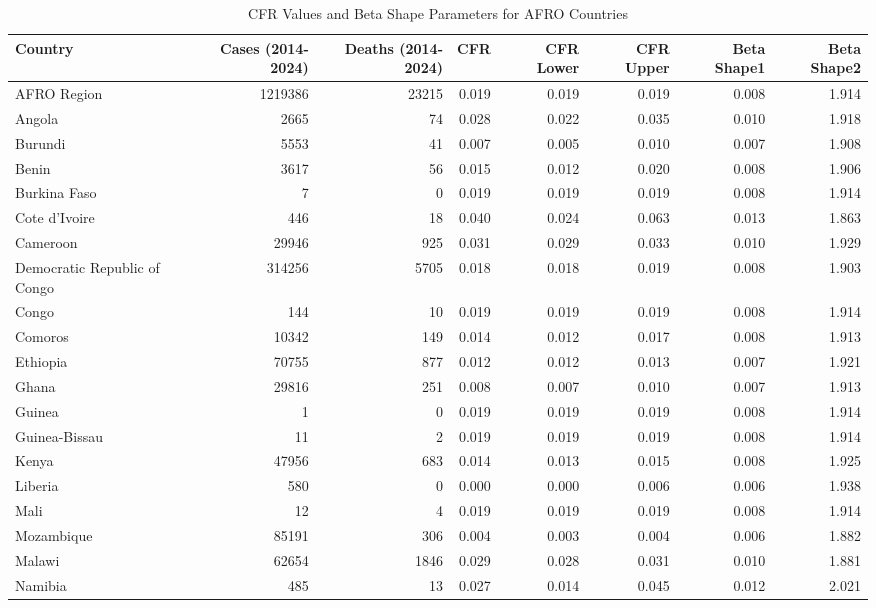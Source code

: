 \documentclass[
]{book}
\begin{document}
\begin{table}
\centering
\caption{\label{tab:cfr}CFR Values and Beta Shape Parameters for AFRO Countries}
\centering
\begin{tabular}[t]{l|r|r|r|r|r|r|r}
\hline
Country & Cases (2014-2024) & Deaths (2014-2024) & CFR & CFR Lower & CFR Upper & Beta Shape1 & Beta Shape2\\
\hline
AFRO Region & 1219386 & 23215 & 0.019 & 0.019 & 0.019 & 0.008 & 1.914\\
\hline
Angola & 2665 & 74 & 0.028 & 0.022 & 0.035 & 0.010 & 1.918\\
\hline
Burundi & 5553 & 41 & 0.007 & 0.005 & 0.010 & 0.007 & 1.908\\
\hline
Benin & 3617 & 56 & 0.015 & 0.012 & 0.020 & 0.008 & 1.906\\
\hline
Burkina Faso & 7 & 0 & 0.019 & 0.019 & 0.019 & 0.008 & 1.914\\
\hline
Cote d'Ivoire & 446 & 18 & 0.040 & 0.024 & 0.063 & 0.013 & 1.863\\
\hline
Cameroon & 29946 & 925 & 0.031 & 0.029 & 0.033 & 0.010 & 1.929\\
\hline
Democratic Republic of Congo & 314256 & 5705 & 0.018 & 0.018 & 0.019 & 0.008 & 1.903\\
\hline
Congo & 144 & 10 & 0.019 & 0.019 & 0.019 & 0.008 & 1.914\\
\hline
Comoros & 10342 & 149 & 0.014 & 0.012 & 0.017 & 0.008 & 1.913\\
\hline
Ethiopia & 70755 & 877 & 0.012 & 0.012 & 0.013 & 0.007 & 1.921\\
\hline
Ghana & 29816 & 251 & 0.008 & 0.007 & 0.010 & 0.007 & 1.913\\
\hline
Guinea & 1 & 0 & 0.019 & 0.019 & 0.019 & 0.008 & 1.914\\
\hline
Guinea-Bissau & 11 & 2 & 0.019 & 0.019 & 0.019 & 0.008 & 1.914\\
\hline
Kenya & 47956 & 683 & 0.014 & 0.013 & 0.015 & 0.008 & 1.925\\
\hline
Liberia & 580 & 0 & 0.000 & 0.000 & 0.006 & 0.006 & 1.938\\
\hline
Mali & 12 & 4 & 0.019 & 0.019 & 0.019 & 0.008 & 1.914\\
\hline
Mozambique & 85191 & 306 & 0.004 & 0.003 & 0.004 & 0.006 & 1.882\\
\hline
Malawi & 62654 & 1846 & 0.029 & 0.028 & 0.031 & 0.010 & 1.881\\
\hline
Namibia & 485 & 13 & 0.027 & 0.014 & 0.045 & 0.012 & 2.021\\

\end{tabular}
\end{table}
\end{document}
